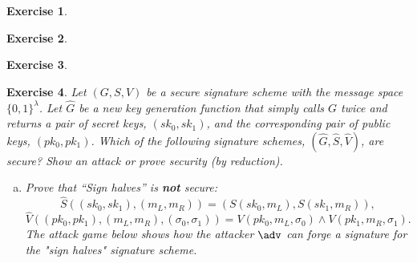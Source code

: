 \documentclass[12pt]{article}
\newtheorem{exercise}{Exercise}
\theoremstyle{definition}
\theoremstyle{remark}
\theoremstyle{definition}
\begin{document}
\begin{exercise}

\end{exercise}
\begin{exercise}

\end{exercise}
\begin{exercise}

\end{exercise}
\begin{exercise}
Let $(G, S, V)$ be a secure signature scheme with the message space $\{0,1\}^\lambda$. Let $\hat{G}$ be a new key generation function that simply calls $G$ twice and returns a pair of secret keys, $(sk_0, sk_1)$, and the corresponding pair of public keys, $(pk_0, pk_1)$. Which of the following signature schemes, $(\hat{G}, \hat{S}, \hat{V})$, are secure? Show an attack or prove security (by reduction).
\begin{enumerate}[(a)]
\item Prove that ``Sign halves'' is \textbf{not} secure: $$\hat{S}((sk_0, sk_1), (m_L, m_R)) = (S(sk_0, m_L), S(sk_1, m_R)),$$ $$\hat{V}((pk_0, pk_1), (m_L, m_R), (\sigma_0, \sigma_1)) = V(pk_0, m_L, \sigma_0)\wedge V(pk_1, m_R, \sigma_1).$$
The attack game below shows how the attacker $\adv$ can forge a signature for the "sign halves" signature scheme.
\begin{figure}[tbhp]
\centering
{}
\end{figure}
\end{enumerate}
\end{exercise}
\end{document}
